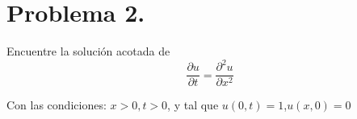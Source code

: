 
\section{Problema 2.} Encuentre la solución acotada de $$\frac{\partial u}{\partial t}=\frac{\partial^{2} u}{\partial x^{2}}$$

Con las condiciones: $ x>0, t>0$, y tal que $u(0, t)=1$,$u(x, 0)=0$